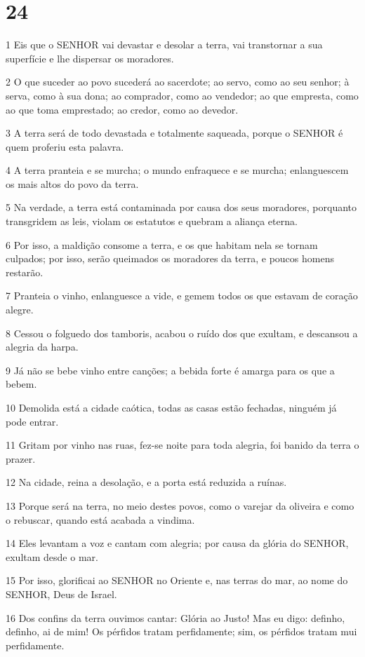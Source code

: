 \chapter{24}

\par 1 Eis que o SENHOR vai devastar e desolar a terra, vai transtornar a sua superfície e lhe dispersar os moradores.
\par 2 O que suceder ao povo sucederá ao sacerdote; ao servo, como ao seu senhor; à serva, como à sua dona; ao comprador, como ao vendedor; ao que empresta, como ao que toma emprestado; ao credor, como ao devedor.
\par 3 A terra será de todo devastada e totalmente saqueada, porque o SENHOR é quem proferiu esta palavra.
\par 4 A terra pranteia e se murcha; o mundo enfraquece e se murcha; enlanguescem os mais altos do povo da terra.
\par 5 Na verdade, a terra está contaminada por causa dos seus moradores, porquanto transgridem as leis, violam os estatutos e quebram a aliança eterna.
\par 6 Por isso, a maldição consome a terra, e os que habitam nela se tornam culpados; por isso, serão queimados os moradores da terra, e poucos homens restarão.
\par 7 Pranteia o vinho, enlanguesce a vide, e gemem todos os que estavam de coração alegre.
\par 8 Cessou o folguedo dos tamboris, acabou o ruído dos que exultam, e descansou a alegria da harpa.
\par 9 Já não se bebe vinho entre canções; a bebida forte é amarga para os que a bebem.
\par 10 Demolida está a cidade caótica, todas as casas estão fechadas, ninguém já pode entrar.
\par 11 Gritam por vinho nas ruas, fez-se noite para toda alegria, foi banido da terra o prazer.
\par 12 Na cidade, reina a desolação, e a porta está reduzida a ruínas.
\par 13 Porque será na terra, no meio destes povos, como o varejar da oliveira e como o rebuscar, quando está acabada a vindima.
\par 14 Eles levantam a voz e cantam com alegria; por causa da glória do SENHOR, exultam desde o mar.
\par 15 Por isso, glorificai ao SENHOR no Oriente e, nas terras do mar, ao nome do SENHOR, Deus de Israel.
\par 16 Dos confins da terra ouvimos cantar: Glória ao Justo! Mas eu digo: definho, definho, ai de mim! Os pérfidos tratam perfidamente; sim, os pérfidos tratam mui perfidamente.

